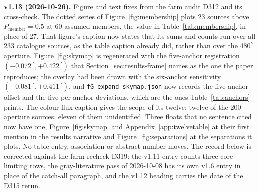 \documentclass[11pt]{article}
\newcommand{\as}{\ensuremath{^{\prime\prime}}}
\begin{document}
\textbf{v1.13 (2026-10-26).} Figure and text fixes from the farm audit D312 and its cross-check. The dotted series of Figure~\ref{fig:membership} plots 23 sources above $P_{\mathrm{member}} = 0.5$ at 60 assumed members, the value in Table~\ref{tab:membership}, in place of 27. That figure's caption now states that its sums and counts run over all 233 catalogue sources, as the table caption already did, rather than over the $480\as$ aperture. Figure~\ref{fig:skymap} is regenerated with the five-anchor registration $(-0.072\as, +0.422\as)$ that Section~\ref{sec:results-frame} names as the one the paper reproduces; the overlay had been drawn with the six-anchor sensitivity $(-0.081\as, +0.411\as)$, and \texttt{fG\_expand\_skymap.json} now records the five-anchor offset and the five per-anchor deviations, which are the ones Table~\ref{tab:anchors} prints. The colour-flux caption gives the scope of its twelve: twelve of the 200 aperture sources, eleven of them unidentified. Three floats that no sentence cited now have one, Figure~\ref{fig:skymap} and Appendix~\ref{app:twelvetable} at their first mention in the results narrative and Figure~\ref{fig:separations} at the separations it plots. No table entry, association or abstract number moves. The record below is corrected against the farm recheck D319: the v1.11 entry counts three core-limiting rows, the gray-literature pass of 2026-10-08 has its own v1.6 entry in place of the catch-all paragraph, and the v1.12 heading carries the date of the D315 rerun.
\end{document}
